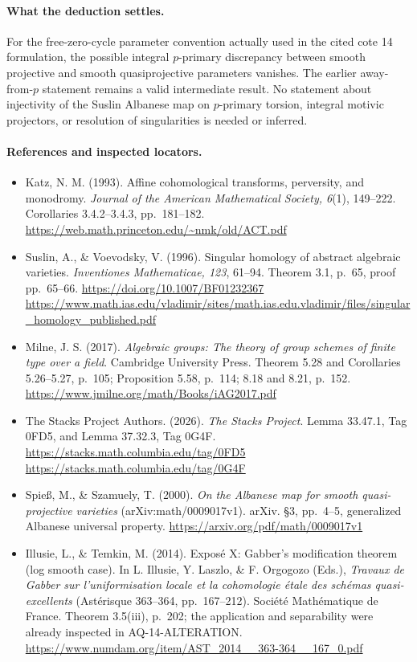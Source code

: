 \paragraph{What the deduction settles.}
For the free-zero-cycle parameter convention actually
used in the cited cote 14 formulation, the possible
integral $p$-primary discrepancy between smooth
projective and smooth quasiprojective parameters
vanishes.  The earlier away-from-$p$ statement remains
a valid intermediate result.  No statement about
injectivity of the Suslin Albanese map on
$p$-primary torsion, integral motivic projectors,
or resolution of singularities is needed or inferred.

\paragraph{References and inspected locators.}
\begin{itemize}
\item Katz, N. M. (1993). Affine cohomological
transforms, perversity, and monodromy.
\emph{Journal of the American Mathematical Society,
6}(1), 149--222. Corollaries 3.4.2--3.4.3,
pp.~181--182.
\url{https://web.math.princeton.edu/~nmk/old/ACT.pdf}
\item Suslin, A., \& Voevodsky, V. (1996).
Singular homology of abstract algebraic varieties.
\emph{Inventiones Mathematicae, 123}, 61--94.
Theorem 3.1, p.~65, proof pp.~65--66.
\url{https://doi.org/10.1007/BF01232367}
\url{https://www.math.ias.edu/vladimir/sites/math.ias.edu.vladimir/files/singular_homology_published.pdf}
\item Milne, J. S. (2017). \emph{Algebraic groups:
The theory of group schemes of finite type over a
field}. Cambridge University Press.
Theorem 5.28 and Corollaries 5.26--5.27, p.~105;
Proposition 5.58, p.~114; 8.18 and 8.21, p.~152.
\url{https://www.jmilne.org/math/Books/iAG2017.pdf}
\item The Stacks Project Authors. (2026).
\emph{The Stacks Project}. Lemma 33.47.1,
Tag 0FD5, and Lemma 37.32.3, Tag 0G4F.
\url{https://stacks.math.columbia.edu/tag/0FD5}
\url{https://stacks.math.columbia.edu/tag/0G4F}
\item Spie{\ss}, M., \& Szamuely, T. (2000).
\emph{On the Albanese map for smooth quasi-projective
varieties} (arXiv:math/0009017v1). arXiv.
\S3, pp.~4--5, generalized Albanese universal property.
\url{https://arxiv.org/pdf/math/0009017v1}
\item Illusie, L., \& Temkin, M. (2014).
Expos\'e X: Gabber's modification theorem
(log smooth case).
In L. Illusie, Y. Laszlo, \& F. Orgogozo (Eds.),
\emph{Travaux de Gabber sur l'uniformisation locale
et la cohomologie \'{e}tale des sch\'emas
quasi-excellents} (Ast\'erisque 363--364,
pp.~167--212). Soci\'et\'e Math\'ematique de France.
Theorem 3.5(iii), p.~202; the application and
separability were already inspected in
AQ-14-ALTERATION.
\url{https://www.numdam.org/item/AST_2014__363-364__167_0.pdf}
\end{itemize}
